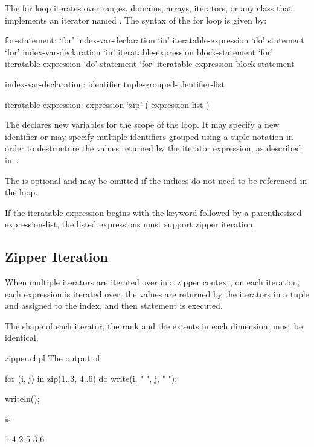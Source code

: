 The for loop iterates over ranges, domains, arrays, iterators, or any
class that implements an iterator named .  The syntax of
the for loop is given by:
\begin{syntax}
for-statement:
  `for' index-var-declaration `in' iteratable-expression `do' statement
  `for' index-var-declaration `in' iteratable-expression block-statement
  `for' iteratable-expression `do' statement
  `for' iteratable-expression block-statement

index-var-declaration:
  identifier
  tuple-grouped-identifier-list

iteratable-expression:
  expression
  `zip' ( expression-list )
\end{syntax}

The  declares new variables for the scope
of the loop.  It may specify a new identifier or may specify multiple
identifiers grouped using a tuple notation in order to destructure the
values returned by the iterator expression, as described
in~.

The  is optional and may be omitted if the
indices do not need to be referenced in the loop.

If the iteratable-expression begins with the keyword  followed
by a parenthesized expression-list, the listed expressions must support 
zipper iteration.

\subsection{Zipper Iteration}
\label{Zipper_Iteration}

When multiple iterators are iterated over in a zipper context, on each
iteration, each expression is iterated over, the values are returned
by the iterators in a tuple and assigned to the index, and then
statement is executed.

The shape of each iterator, the rank and the extents in each
dimension, must be identical.

\begin{chapelexample}{zipper.chpl}
The output of
\begin{chapel}
for (i, j) in zip(1..3, 4..6) do
  write(i, " ", j, " ");
\end{chapel}
\begin{chapelpost}
writeln();
\end{chapelpost}
is
\begin{chapelprintoutput}{}
1 4 2 5 3 6 
\end{chapelprintoutput}
\end{chapelexample}

